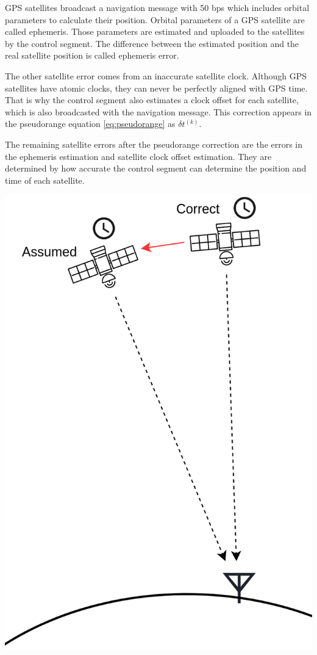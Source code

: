 \begin{minipage}{0.6\textwidth}
  GPS satellites broadcast a navigation message with 50 bps which includes orbital parameters to calculate their position.
  Orbital parameters of a GPS satellite are called ephemeris. 
  Those parameters are estimated and uploaded to the satellites by the control segment.
  The difference between the estimated position and the real satellite position is called ephemeris error.
  
  The other satellite error comes from an inaccurate satellite clock.
  Although GPS satellites have atomic clocks, they can never be perfectly aligned with GPS time.
  That is why the control segment also estimates a clock offset for each satellite, which is also broadcasted with the navigation message.
  This correction appears in the pseudorange equation \ref{eq:pseudorange} as $\delta t^{(k)}$.
  
  The remaining satellite errors after the pseudorange correction are the errors in the ephemeris estimation and satellite clock offset estimation.
  They are determined by how accurate the control segment can determine the position and time of each satellite.
\end{minipage}
\hfill
\begin{minipage}{0.38\textwidth}
 \flushright
 \includegraphics[width=\textwidth]{images/Satellite_Errors.png}
\end{minipage}

